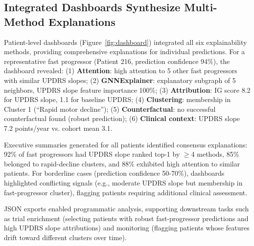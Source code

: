 \subsection{Integrated Dashboards Synthesize Multi-Method Explanations}

Patient-level dashboards (Figure~\ref{fig:dashboard}) integrated all six explainability methods, providing comprehensive explanations for individual predictions. For a representative fast progressor (Patient 216, prediction confidence 94\%), the dashboard revealed: (1) \textbf{Attention}: high attention to 5 other fast progressors with similar UPDRS slopes; (2) \textbf{GNNExplainer}: explanatory subgraph of 5 neighbors, UPDRS slope feature importance 100\%; (3) \textbf{Attribution}: IG score 8.2 for UPDRS slope, 1.1 for baseline UPDRS; (4) \textbf{Clustering}: membership in Cluster 1 (``Rapid motor decline''); (5) \textbf{Counterfactual}: no successful counterfactual found (robust prediction); (6) \textbf{Clinical context}: UPDRS slope 7.2 points/year vs. cohort mean 3.1.

Executive summaries generated for all patients identified consensus explanations: 92\% of fast progressors had UPDRS slope ranked top-1 by $\geq$4 methods, 85\% belonged to rapid-decline clusters, and 88\% exhibited high attention to similar patients. For borderline cases (prediction confidence 50-70\%), dashboards highlighted conflicting signals (e.g., moderate UPDRS slope but membership in fast-progressor cluster), flagging patients requiring additional clinical assessment.

JSON exports enabled programmatic analysis, supporting downstream tasks such as trial enrichment (selecting patients with robust fast-progressor predictions and high UPDRS slope attributions) and monitoring (flagging patients whose features drift toward different clusters over time).
